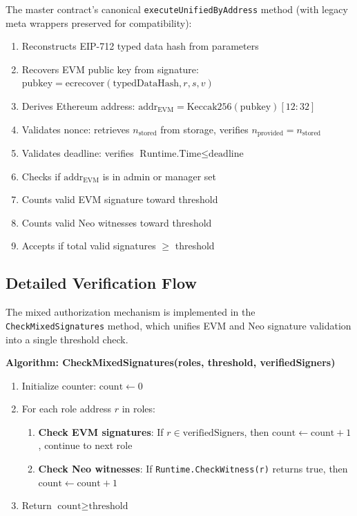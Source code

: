 \documentclass[10pt,twocolumn]{article}
\newcommand{\code}[1]{\texttt{\small #1}}
\begin{document}
{The master contract's canonical \code{executeUnifiedByAddress} method (with legacy meta wrappers preserved for compatibility):
\begin{enumerate}[leftmargin=*,topsep=2pt,itemsep=1pt]
\item Reconstructs EIP-712 typed data hash from parameters
\item Recovers EVM public key from signature: $\text{pubkey} = \text{ecrecover}(\text{typedDataHash}, r, s, v)$
\item Derives Ethereum address: $\text{addr}_{\text{EVM}} = \text{Keccak256}(\text{pubkey})[12:32]$
\item Validates nonce: retrieves $n_{\text{stored}}$ from storage, verifies $n_{\text{provided}} = n_{\text{stored}}$
\item Validates deadline: verifies $\text{Runtime.Time} \leq \text{deadline}$
\item Checks if $\text{addr}_{\text{EVM}}$ is in admin or manager set
\item Counts valid EVM signature toward threshold
\item Counts valid Neo witnesses toward threshold
\item Accepts if total valid signatures $\geq$ threshold
\end{enumerate}

\subsection{Detailed Verification Flow}

The mixed authorization mechanism is implemented in the \code{CheckMixedSignatures} method, which unifies EVM and Neo signature validation into a single threshold check.

\textbf{Algorithm: CheckMixedSignatures(roles, threshold, verifiedSigners)}

\begin{enumerate}[leftmargin=*,topsep=2pt,itemsep=1pt]
\item Initialize counter: $\text{count} \gets 0$
\item For each role address $r$ in roles:
  \begin{enumerate}[leftmargin=*,topsep=2pt,itemsep=1pt]
  \item \textbf{Check EVM signatures}: If $r \in \text{verifiedSigners}$, then $\text{count} \gets \text{count} + 1$, continue to next role
  \item \textbf{Check Neo witnesses}: If \code{Runtime.CheckWitness(r)} returns true, then $\text{count} \gets \text{count} + 1$
  \end{enumerate}
\item Return $\text{count} \geq \text{threshold}$
\end{enumerate}

}
\end{document}

